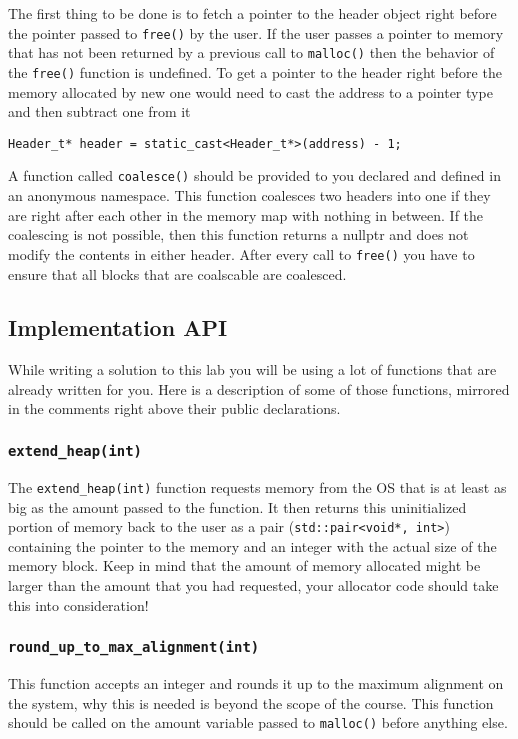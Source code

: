 \documentclass{article}
\begin{document}
The first thing to be done is to fetch a pointer to the header object right
before the pointer passed to \texttt{free()} by the user.  If the user passes
a pointer to memory that has not been returned by a previous call to
\texttt{malloc()} then the behavior of the \texttt{free()} function is
undefined.  To get a pointer to the header right before the memory allocated
by new one would need to cast the address to a pointer type and then subtract
one from it

\begin{lstlisting}
Header_t* header = static_cast<Header_t*>(address) - 1;
\end{lstlisting}

A function called \texttt{coalesce()} should be provided to you declared and
defined in an anonymous namespace.  This function coalesces two headers into
one if they are right after each other in the memory map with nothing in
between.  If the coalescing is not possible, then this function returns a
nullptr and does not modify the contents in either header.  After every call
to \texttt{free()} you have to ensure that all blocks that are coalscable are
coalesced.

\subsection{Implementation API}
While writing a solution to this lab you will be using a lot of functions that
are already written for you.  Here is a description of some of those
functions, mirrored in the comments right above their public declarations.

\subsubsection{\texttt{extend\_heap(int)}}
The \texttt{extend\_heap(int)} function requests memory from the OS that is at
least as big as the amount passed to the function.  It then returns this
uninitialized portion of memory back to the user as a pair
(\texttt{std::pair<void*, int>}) containing the pointer to the memory and an
integer with the actual size of the memory block.  Keep in mind that the
amount of memory allocated might be larger than the amount that you had
requested, your allocator code should take this into consideration!

\subsubsection{\texttt{round\_up\_to\_max\_alignment(int)}}
This function accepts an integer and rounds it up to the maximum alignment on
the system, why this is needed is beyond the scope of the course.  This
function should be called on the amount variable passed to \texttt{malloc()}
before anything else.
\end{document}

